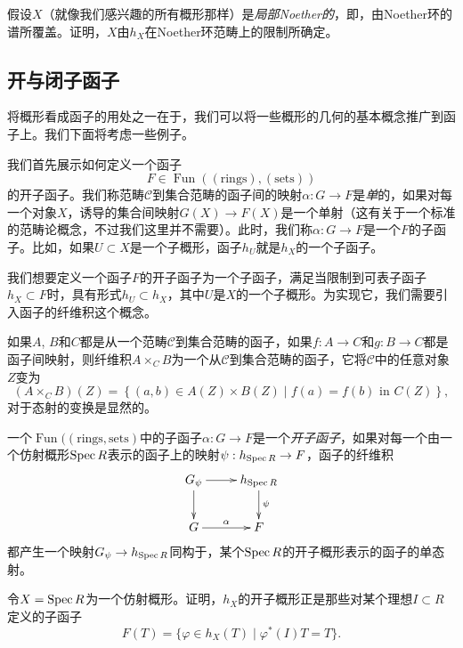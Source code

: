 \begin{exe}
假设$X$（就像我们感兴趣的所有概形那样）是\textit{局部Noether的}，即，由Noether环的谱所覆盖。证明，$X$由$h_X$在Noether环范畴上的限制所确定。
\end{exe}

\subsection{开与闭子函子} \label{s:6.1.1}

将概形看成函子的用处之一在于，我们可以将一些概形的几何的基本概念推广到函子上。我们下面将考虑一些例子。

我们首先展示如何定义一个函子
\[
	F\in \operatorname{Fun}((\text{rings}),(\text{sets}))
\]
的开子函子。我们称范畴$\mathscr C$到集合范畴的函子间的映射$\alpha:G\to F$是\textit{单}的，如果对每一个对象$X$，诱导的集合间映射$G(X)\to F(X)$是一个单射（这有关于一个标准的范畴论概念，不过我们这里并不需要）。此时，我们称$\alpha:G\to F$是一个$F$的子函子。比如，如果$U\subset X$是一个子概形，函子$h_U$就是$h_X$的一个子函子。

我们想要定义一个函子$F$的开子函子为一个子函子，满足当限制到可表子函子$h_X\subset F$时，具有形式$h_U\subset h_X$，其中$U$是$X$的一个子概形。为实现它，我们需要引入函子的纤维积这个概念。

\begin{defi} \label{defi:6.4}
	如果$A$, $B$和$C$都是从一个范畴$\mathscr C$到集合范畴的函子，如果$f:A\to C$和$g:B\to C$都是函子间映射，则纤维积$A\times_C B$为一个从$\mathscr C$到集合范畴的函子，它将$\mathscr C$中的任意对象$Z$变为
	\[
		(A\times_C B)(Z)=\left\{(a,b)\in A(Z)\times B(Z)\;|\; f(a)=f(b)\text{ in } C(Z)\right\},
	\]
	对于态射的变换是显然的。
\end{defi}

\begin{defi} \label{defi:6.5}
	一个$\operatorname{Fun}((\text{rings},\text{sets})$中的子函子$\alpha:G\to F$是一个\textit{开子函子}，如果对每一个由一个仿射概形$\operatorname{Spec} R$表示的函子上的映射$\psi:h_{\operatorname{Spec} R}\to F$，函子的纤维积
	\[
		\xymatrix{
			G_\psi\ar[r]\ar[d]&h_{\spec R}\ar[d]^\psi\\
			G\ar[r]^\alpha& F
		}
	\]
	都产生一个映射$G_\psi\to h_{\operatorname{Spec} R}$同构于，某个$\operatorname{Spec} R$的开子概形表示的函子的单态射。
\end{defi}

\begin{exe} \label{exe:6.6}
	令$X=\operatorname{Spec} R$为一个仿射概形。证明，$h_X$的开子概形正是那些对某个理想$I\subset R$定义的子函子
	\[
		F(T)=\{\varphi\in h_X(T)\; | \; \varphi^*(I)T=T\}.
	\]
\end{exe}

